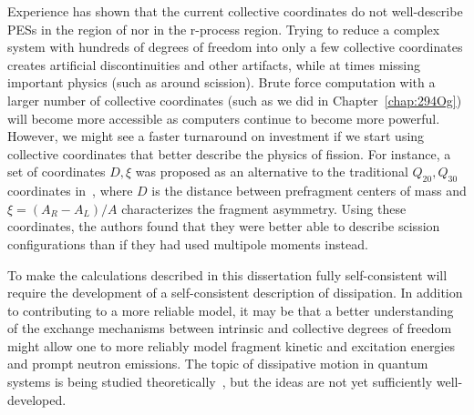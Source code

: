 Experience has shown that the current collective coordinates do not well-describe PESs in the region of {\Pt} nor in the r-process region. Trying to reduce a complex system with hundreds of degrees of freedom into only a few collective coordinates creates artificial discontinuities and other artifacts, while at times missing important physics (such as around scission). Brute force computation with a larger number of collective coordinates (such as we did in Chapter~\ref{chap:294Og}) will become more accessible as computers continue to become more powerful. However, we might see a faster turnaround on investment if we start using collective coordinates that better describe the physics of fission. For instance, a set of coordinates $D, \xi$ was proposed as an alternative to the traditional $Q_{20}, Q_{30}$ coordinates in~\cite{Younes2012}, where $D$ is the distance between prefragment centers of mass and $\xi = (A_R-A_L)/A$ characterizes the fragment asymmetry. Using these coordinates, the authors found that they were better able to describe scission configurations than if they had used multipole moments instead. %


To make the calculations described in this dissertation fully self-consistent will require the development of a self-consistent description of dissipation. In addition to contributing to a more reliable model, it may be that a better understanding of the exchange mechanisms between intrinsic and collective degrees of freedom might allow one to more reliably model fragment kinetic and excitation energies and prompt neutron emissions. The topic of dissipative motion in quantum systems is being studied theoretically~\cite{Koch2008, Lacroix2008, Hupin2010, Sargsyan2010}, but the ideas are not yet sufficiently well-developed.


